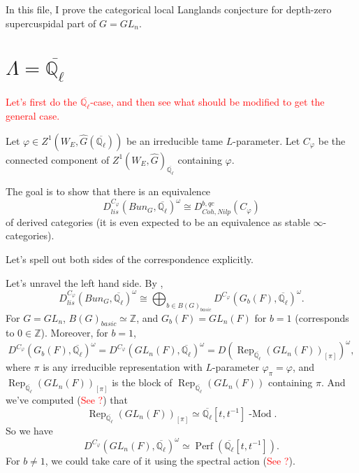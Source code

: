 \documentclass{article}
\newcommand{\red}[1]{\textcolor{red}{#1}}
\newcommand{\Rep}{\operatorname{Rep}}
\newcommand{\Modl}{\operatorname{-Mod}}
\newcommand{\Perf}{\operatorname{Perf}}
\begin{document}
	In this file, I prove the categorical local Langlands conjecture for depth-zero supercuspidal part of $G=GL_n$.
	
	\section{$\Lambda=\overline{\mathbb{Q}_{\ell}}$}
	
	\red{Let's first do the $\overline{\mathbb{Q}_{\ell}}$-case, and then see what should be modified to get the general case.}
	
	Let $\varphi \in Z^1(W_E, \hat{G}(\overline{\mathbb{Q}_{\ell}}))$ be an irreducible tame $L$-parameter. Let $C_{\varphi}$ be the connected component of $Z^1(W_E, \hat{G})_{\overline{\mathbb{Q}_{\ell}}}$ containing $\varphi$. 
	
	The goal is to show that there is an equivalence
	$$D_{lis}^{C_{\varphi}}(Bun_G, \overline{\mathbb{Q}_{\ell}})^{\omega} \cong D^{b, qc}_{Coh, Nilp}(C_{\varphi})$$
	of derived categories (it is even expected to be an equivalence as stable $\infty$-categories).
	
	Let's spell out both sides of the correspondence explicitly.
	
	Let's unravel the left hand side. By \cite[Section X.2]{fargues2021geometrization},
	$$D_{lis}^{C_{\varphi}}(Bun_G, \overline{\mathbb{Q}_{\ell}})^{\omega} \cong \bigoplus_{b \in B(G)_{basic}}D^{C_{\varphi}}(G_b(F), \overline{\mathbb{Q}_{\ell}})^{\omega}.$$
	For $G=GL_n$, $B(G)_{basic} \simeq \mathbb{Z}$, and $G_b(F)=GL_n(F)$ for $b=1$ (corresponds to $0 \in \mathbb{Z}$). Moreover, for $b=1$, 
	$$D^{C_{\varphi}}(G_b(F), \overline{\mathbb{Q}_{\ell}})^{\omega}=D^{C_{\varphi}}(GL_n(F), \overline{\mathbb{Q}_{\ell}})^{\omega}=D(\Rep_{\overline{\mathbb{Q}_{\ell}}}\left(GL_n(F)\right)_{[\pi]})^{\omega},$$
	where $\pi$ is any irreducible representation with $L$-parameter $\varphi_{\pi}=\varphi$, and $\Rep_{\overline{\mathbb{Q}_{\ell}}}(GL_n(F))_{[\pi]}$ is the block of $\Rep_{\overline{\mathbb{Q}_{\ell}}}\left(GL_n(F)\right)$ containing $\pi$. And we've computed (\red{See ?}) that
	$$\Rep_{\overline{\mathbb{Q}_{\ell}}}(GL_n(F))_{[\pi]} \simeq \overline{\mathbb{Q}_{\ell}}[t, t^{-1}]\Modl.$$ So we have
	$$D^{C_{\varphi}}(GL_n(F), \overline{\mathbb{Q}_{\ell}})^{\omega} \simeq \Perf(\overline{\mathbb{Q}_{\ell}}[t, t^{-1}]).$$ For $b \neq 1$, we could take care of it using the spectral action (\red{See ?}).
	
\end{document}
